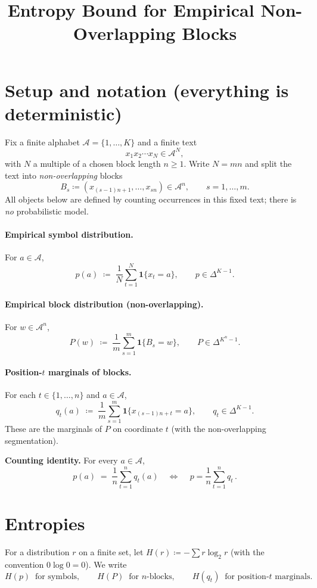 \documentclass[11pt]{article}
\title{Entropy Bound for Empirical Non-Overlapping Blocks}
\author{}
\date{}
\begin{document}
\maketitle

\section*{Setup and notation (everything is deterministic)}
Fix a finite alphabet $\mathcal A=\{1,\dots,K\}$ and a finite text
\[
x_1x_2\cdots x_N\in\mathcal A^N,
\]
with $N$ a multiple of a chosen block length $n\ge1$. Write $N=mn$ and split the text into \emph{non-overlapping} blocks
\[
B_s \coloneqq (x_{(s-1)n+1},\dots,x_{sn})\in\mathcal A^n,\qquad s=1,\dots,m.
\]
All objects below are defined by counting occurrences in this fixed text; there is \emph{no} probabilistic model.

\paragraph{Empirical symbol distribution.}
For $a\in\mathcal A$,
\[
p(a)\;\coloneqq\;\frac{1}{N}\sum_{t=1}^{N}\mathbf 1\{x_t=a\},\qquad
p\in\Delta^{K-1}.
\]

\paragraph{Empirical block distribution (non-overlapping).}
For $w\in\mathcal A^n$,
\[
P(w)\;\coloneqq\;\frac{1}{m}\sum_{s=1}^{m}\mathbf 1\{B_s=w\},\qquad
P\in\Delta^{K^n-1}.
\]

\paragraph{Position-$t$ marginals of blocks.}
For each $t\in\{1,\dots,n\}$ and $a\in\mathcal A$,
\[
q_t(a)\;\coloneqq\;\frac{1}{m}\sum_{s=1}^{m}\mathbf 1\{x_{(s-1)n+t}=a\},\qquad
q_t\in\Delta^{K-1}.
\]
These are the marginals of $P$ on coordinate $t$ (with the non-overlapping segmentation).

\medskip
\noindent\textbf{Counting identity.} For every $a\in\mathcal A$,
\begin{equation}
\label{eq:avg-marg}
p(a)\;=\;\frac{1}{n}\sum_{t=1}^{n} q_t(a)
\quad\Longleftrightarrow\quad
\boxed{\,p=\frac{1}{n}\sum_{t=1}^{n} q_t\,}.
\end{equation}

\section*{Entropies}
For a distribution $r$ on a finite set, let $H(r)\coloneqq -\sum r\log_2 r$ (with the convention $0\log 0=0$). We write
\[
H(p)\ \text{ for symbols},\qquad H(P)\ \text{ for $n$-blocks},\qquad H(q_t)\ \text{ for position-$t$ marginals}.
\]
\end{document}

